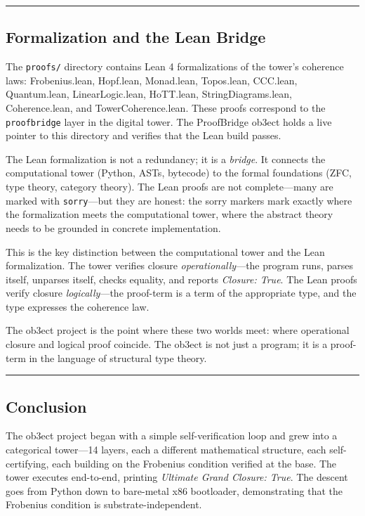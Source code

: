 \documentclass[12pt,a4paper]{article}
\begin{document}
\begin{center}
\rule{0.5\textwidth}{0.4pt}
\end{center}

\subsection{Formalization and the Lean Bridge}

The \texttt{proofs/} directory contains Lean 4 formalizations of the tower's coherence laws: Frobenius.lean, Hopf.lean, Monad.lean, Topos.lean, CCC.lean, Quantum.lean, LinearLogic.lean, HoTT.lean, StringDiagrams.lean, Coherence.lean, and TowerCoherence.lean. These proofs correspond to the \texttt{proofbridge} layer in the digital tower. The ProofBridge ob3ect holds a live pointer to this directory and verifies that the Lean build passes.

The Lean formalization is not a redundancy; it is a \emph{bridge}. It connects the computational tower (Python, ASTs, bytecode) to the formal foundations (ZFC, type theory, category theory). The Lean proofs are not complete---many are marked with \texttt{sorry}---but they are honest: the sorry markers mark exactly where the formalization meets the computational tower, where the abstract theory needs to be grounded in concrete implementation.

This is the key distinction between the computational tower and the Lean formalization. The tower verifies closure \emph{operationally}---the program runs, parses itself, unparses itself, checks equality, and reports \emph{Closure: True}. The Lean proofs verify closure \emph{logically}---the proof-term is a term of the appropriate type, and the type expresses the coherence law.

The ob3ect project is the point where these two worlds meet: where operational closure and logical proof coincide. The ob3ect is not just a program; it is a proof-term in the language of structural type theory.

\begin{center}
\rule{0.5\textwidth}{0.4pt}
\end{center}

\subsection{Conclusion}

The ob3ect project began with a simple self-verification loop and grew into a categorical tower---14 layers, each a different mathematical structure, each self-certifying, each building on the Frobenius condition verified at the base. The tower executes end-to-end, printing \emph{Ultimate Grand Closure: True}. The descent goes from Python down to bare-metal x86 bootloader, demonstrating that the Frobenius condition is substrate-independent.
\end{document}
